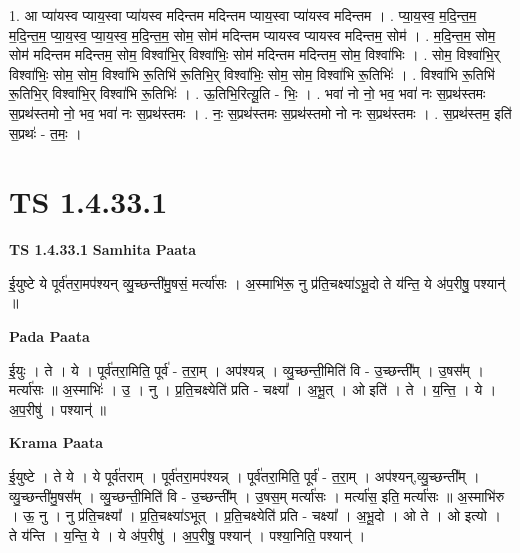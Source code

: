 \documentclass[17pt]{extarticle}
\begin{document}
1. आ प्या॑यस्व प्याय॒स्वा प्या॑यस्व मदिन्तम मदिन्तम प्याय॒स्वा प्या॑यस्व मदिन्तम । . प्या॒य॒स्व॒ म॒दि॒न्त॒म॒ म॒दि॒न्त॒म॒ प्या॒य॒स्व॒ प्या॒य॒स्व॒ म॒दि॒न्त॒म॒ सोम॒ सोम॑ मदिन्तम प्यायस्व प्यायस्व मदिन्तम॒ सोम॑ । . म॒दि॒न्त॒म॒ सोम॒ सोम॑ मदिन्तम मदिन्तम॒ सोम॒ विश्वा॑भि॒र् विश्वा॑भिः॒ सोम॑ मदिन्तम मदिन्तम॒ सोम॒ विश्वा॑भिः । . सोम॒ विश्वा॑भि॒र् विश्वा॑भिः॒ सोम॒ सोम॒ विश्वा॑भि रू॒तिभि॑ रू॒तिभि॒र् विश्वा॑भिः॒ सोम॒ सोम॒ विश्वा॑भि रू॒तिभिः॑ । . विश्वा॑भि रू॒तिभि॑ रू॒तिभि॒र् विश्वा॑भि॒र् विश्वा॑भि रू॒तिभिः॑ । . ऊ॒तिभि॒रित्यू॒ति - भिः॒ । . भवा॑ नो नो॒ भव॒ भवा॑ नः स॒प्रथ॑स्तमः स॒प्रथ॑स्तमो नो॒ भव॒ भवा॑ नः स॒प्रथ॑स्तमः । . नः॒ स॒प्रथ॑स्तमः स॒प्रथ॑स्तमो नो नः स॒प्रथ॑स्तमः । . स॒प्रथ॑स्तम॒ इति॑ स॒प्रथः॑ - त॒मः॒ । \newline
\pagebreak
{}
\section*{ TS 1.4.33.1 }

\textbf{TS 1.4.33.1 } \newline
\textbf{Samhita Paata} \newline

ई॒युष्टे ये पूर्व॑तरा॒मप॑श्यन् व्यु॒च्छन्ती॑मु॒षसं॒ मर्त्या॑सः । अ॒स्माभि॑रू॒ नु प्र॑ति॒चक्ष्या॑ऽभू॒दो ते य॑न्ति॒ ये अ॑प॒रीषु॒ पश्यान्॑ ॥ \newline

\textbf{Pada Paata} \newline

ई॒युः । ते । ये । पूर्व॑तरा॒मिति॒ पूर्व॑ - त॒रा॒म् । अप॑श्यन्न् । व्यु॒च्छन्ती॒मिति॑ वि - उ॒च्छन्ती᳚म् । उ॒षस᳚म् । मर्त्या॑सः ॥ अ॒स्माभिः॑ । उ॒ । नु । प्र॒ति॒चक्ष्येति॑ प्रति - चक्ष्या᳚ । अ॒भू॒त् । ओ इति॑ । ते । य॒न्ति॒ । ये । अ॒प॒रीषु॑ । पश्यान्॑ ॥  \newline


\textbf{Krama Paata} \newline

ई॒युष्टे । ते ये । ये पूर्व॑तराम् । पूर्व॑तरा॒मप॑श्यन्न् । पूर्व॑तरा॒मिति॒ पूर्व॑ - त॒रा॒म् । अप॑श्यन्,व्यु॒च्छन्ती᳚म् । व्यु॒च्छन्ती॑मु॒षस᳚म् । व्यु॒च्छन्ती॒मिति॑ वि - उ॒च्छन्ती᳚म् । उ॒षस॒म् मर्त्या॑सः । मर्त्या॑स॒ इति॒ मर्त्या॑सः ॥ अ॒स्माभि॑रु । ऊ॒ नु । नु प्र॑ति॒चक्ष्या᳚ । प्र॒ति॒चक्ष्या॑ऽभूत् । प्र॒ति॒चक्ष्येति॑ प्रति - चक्ष्या᳚ । अ॒भू॒दो । ओ ते । ओ इत्यो । ते य॑न्ति । य॒न्ति॒ ये । ये अ॑प॒रीषु॑ । अ॒प॒रीषु॒ पश्यान्॑ । पश्या॒निति॒ पश्यान्॑ । \newline
\end{document}
